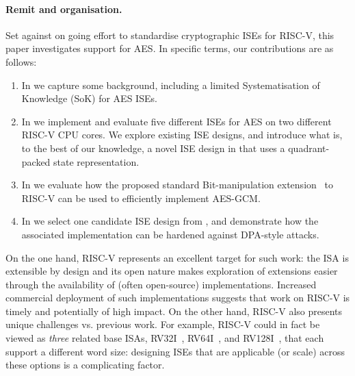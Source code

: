 
\paragraph{Remit and organisation.}

Set against on going effort to standardise cryptographic ISEs for RISC-V,
this paper investigates support for AES.
In specific terms, our contributions are as follows:

\begin{enumerate}

\item In 
      we capture some background, including a limited
      Systematisation of Knowledge (SoK)
      for AES ISEs.

\item In 
      we implement and evaluate five different ISEs for AES on two different 
      RISC-V CPU cores.
      We explore existing ISE designs, 
      and introduce what is, to the best of our knowledge, a novel ISE design
      in  
      that uses a quadrant-packed state representation.

\item In
      we evaluate how the
      proposed standard 
      Bit-manipulation
      extension~\cite[Section 21]{RV:ISA:I:19}
      to RISC-V can be used to efficiently implement AES-GCM.

\item In
      we select one candidate ISE design from 
      ,
      and demonstrate how the associated implementation can be hardened
      against DPA-style attacks.

\end{enumerate}

\noindent
On the one hand, 
RISC-V represents an excellent target for such work:
the ISA is extensible by design and its open nature makes
exploration of extensions easier through the availability of
(often open-source) implementations.  
Increased commercial deployment of such implementations suggests that work 
on RISC-V is timely and potentially of high impact.
On the other hand, RISC-V also presents unique challenges vs. previous work.
For example,
RISC-V could in fact be viewed as {\em three} related base ISAs,
 RV32I~\cite[Section 2]{RV:ISA:I:19},
 RV64I~\cite[Section 5]{RV:ISA:I:19},
and
RV128I~\cite[Section 6]{RV:ISA:I:19},
that each support a different word size:
designing ISEs that are applicable (or scale) across these options is a
complicating factor.

%

